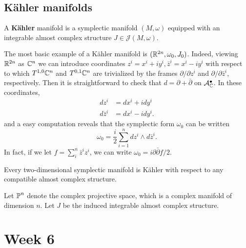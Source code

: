 \documentclass{amsart}
\begin{document}
\subsection{K\"ahler manifolds}

\begin{definition}
    A \textbf{K\"ahler} manifold is a symplectic manifold $(M,\omega)$ equipped
    with an integrable almost complex structure $J\in\mathcal{J}(M,\omega)$.
\end{definition}

\begin{example}
    The most basic example of a K\"ahler manifold is $(\mathbb{R}^{2n},\omega_0,J_0)$.
    Indeed, viewing $\mathbb{R}^{2n}$ as $\mathbb{C}^n$ we can introduce coordinates $z^i=x^i+iy^i,\bar z^i=x^i-iy^i$ with
    respect to which $T^{1,0}\mathbb{C}^{n}$ and $T^{0,1}\mathbb{C}^{n}$ are trivialized by
    the frames $\partial/\partial z^i$ and $\partial/\partial \bar z^i$, respectively.
    Then it is straightforward to check that $d=\partial+\bar\partial$ on $\mathcal{A}^\bullet_{\mathbb{C}}$.
    In these coordinates,
    \begin{align*}
        dz^i &= dx^i+idy^i\\
        d\bar z^i &= dx^i - idy^i.
    \end{align*}
    and a easy computation reveals that the symplectic form $\omega_0$ can be written
    \begin{equation*}
        \omega_0 = \frac{i}{2}\sum_{i=1}^ndz^i\wedge d\bar z^i.
    \end{equation*}
    In fact, if we let $f=\sum_i^n\bar z^iz^i$, we can write $\omega_0=i\partial\bar\partial f/2$.
\end{example}

\begin{example}
    Every two-dimensional symplectic manifold is K\"ahler with respect to any compatible
    almost complex structure.
\end{example}

\begin{example}
    Let $\operatorname{\mathbb{P}}^n$ denote the complex projective space, which is a complex manifold of dimension $n$. 
    Let $J$ be the induced integrable almost complex structure.
\end{example}


\newpage
\section{Week 6}
\end{document}
